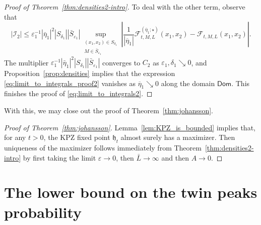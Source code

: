\documentclass[oneside,final,11pt]{amsart}
\theoremstyle{definition}
\newcommand{\fh}{\mathfrak{h}}
\newcommand{\Dom}{\mathsf{Dom}}
\newcommand{\dens}{\CF}
\newcommand{\1}[1]{\mathbf{1}_{#1}}
\newcommand{\eps}{\varepsilon}
\newcommand{\red}[1]{{\color{red}#1}}
\newcommand{\CI}{\mathcal{I}}
\newcommand{\CF}{\mathcal{F}}
\numberwithin{equation}{section}
\begin{document}
\begin{proof}[Proof of Theorem~\ref{thm:densities2-intro}]
To deal with the other term, observe that
\begin{equation}\label{eq:limit_to_integrals_proof2}
|\CI_2|\leq \eps_1^{-1} |\bar \eta_1|^2 |S_{\delta_1}| |\bar S_{\eps_1}| \sup_{\substack{(x_1, x_2) \in S_{\delta_1} \\ M \in \bar S_{\eps_1}}} \left| \frac{1}{|\overline \eta_1|} \dens^{(\overline\eta_1; \star)}_{t, M, L}(x_1, x_2) - \dens_{t, M, L}(x_1, x_2) \right|.
\end{equation}
The multiplier $\eps_1^{-1} |\bar \eta_1|^2 |S_{\delta_1}| |\bar S_{\eps_1}|$ converges to $C_2$ as $\eps_1, \delta_1 \searrow 0$, and Proposition~\ref{prop:densities} implies that the expression \eqref{eq:limit_to_integrals_proof2} vanishes as $\overline \eta_1 \searrow 0$ along the domain $\Dom$. This finishes the proof of \eqref{eq:limit_to_integrals2}.
\end{proof}

With this, we may close out the proof of Theorem~\ref{thm:johansson}.

\begin{proof}[Proof of Theorem~\ref{thm:johansson}]
Lemma~\ref{lem:KPZ_is_bounded} implies that, for any $t > 0$, the KPZ fixed point $\fh_t$ almost surely has a maximizer. Then uniqueness of the maximizer follows immediately from Theorem~\ref{thm:densities2-intro} by first taking the limit $\varepsilon\to 0$, then $\bar L \to \infty$ and then $A \to 0$.
\end{proof}



\renewcommand{\red}[1]{{\color{red} #1}}






\section{The lower bound on the twin peaks probability}
\label{sec:TP_probability}

\end{document}
